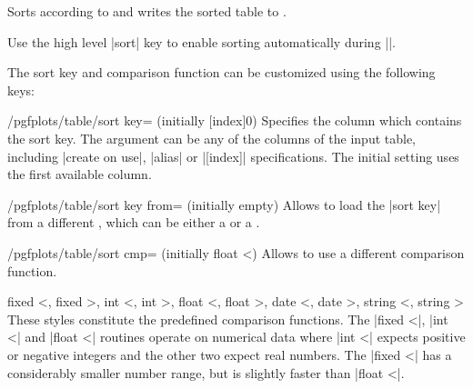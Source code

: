 \begin{command}{\pgfplotstablesort{}}
    Sorts  according to 
    and writes the sorted table to .

    Use the high level |sort| key to enable sorting automatically during
    |\pgfplotstabletypeset|.
\begin{codeexample}[pre={\begin{lateximage}},post={\end{lateximage}}]
\pgfplotstablesort{}
\pgfplotstabletypeset[columns/c/.style={string type}]{\result}%
\end{codeexample}

    The sort key and comparison function can be customized using the following
    keys:

    \begin{key}{/pgfplots/table/sort key= (initially [index]0)}
        Specifies the column which contains the sort key. The argument
         can be any of the columns of the input table, including
        |create on use|, |alias| or |[index]| specifications. The
        initial setting uses the first available column.
    \end{key}

    \begin{key}{/pgfplots/table/sort key from= (initially empty)}
        Allows to load the |sort key| from a different , which can
        be either a  or a .
    \end{key}

    \begin{key}{/pgfplots/table/sort cmp= (initially float <)}
        Allows to use a different comparison function.

        \begin{pgfplotskeylist}{%
            fixed <,
            fixed >,
            int <,
            int >,
            float <,
            float >,
            date <,
            date >,
            string <,
            string >%
        }
            These styles constitute the predefined comparison functions. The
            |fixed <|, |int <| and |float <| routines operate on numerical data
            where |int <| expects positive or negative integers and the other
            two expect real numbers. The |fixed <| has a considerably smaller
            number range, but is slightly faster than |float <|.


\end{pgfplotskeylist}
\end{key}
\end{command}
